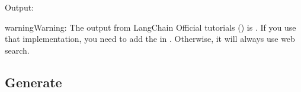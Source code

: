\documentclass[letterpaper,11pt,english]{sphinxmanual}
\begin{document}
\sphinxAtStartPar
Output:

\begin{sphinxVerbatim}[commandchars=\\\{\}]
\end{sphinxVerbatim}

\begin{sphinxadmonition}{warning}{Warning:}
\sphinxAtStartPar
The output from LangChain Official tutorials () is
. If you use that implementation, you need to add
the  in . Otherwise, it will always
use web search.
\end{sphinxadmonition}


\subsection{Generate}
\label{\detokenize{rag:id11}}
\end{document}
